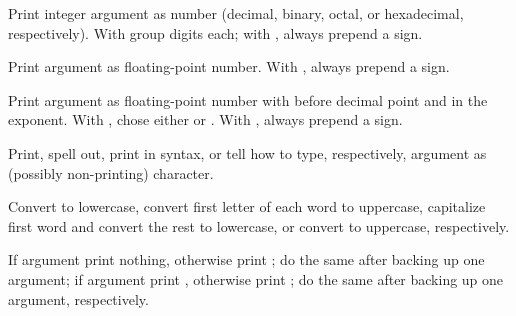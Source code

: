 \begin{LIST}{1cm}
\begin{LIST}{.5cm}
    {
    Print integer argument as number (decimal, binary, octal, or
    hexadecimal, respectively). With \kwd{:} group digits 
     each; with , always prepend a sign.
  }

    {
    Print argument as floating-point number. With , always prepend a sign.
  }

    {
    Print argument as floating-point number with 
    before decimal point and  in the
    exponent. With , chose either  or . With , always prepend a sign.
  }

    {
    Print, spell out, print in \kwd{\#$\backslash$} syntax, or tell how to type, respectively, argument as
    (possibly non-printing) character.
  }

    {
    Convert to lowercase, convert first letter of each word to
    uppercase, capitalize first word and convert
    the rest to lowercase, or convert to uppercase, respectively.
  }

    {
    If argument   print nothing, otherwise print ;
    do the same after backing up one argument; if argument  
    print , otherwise print ; do the same after
    backing up one argument, respectively. 
  }


\end{LIST}
\end{LIST}
